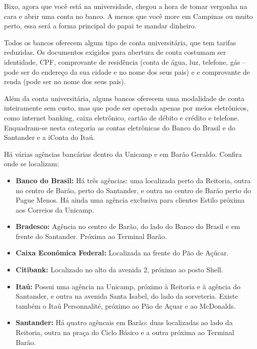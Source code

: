 Bixo, agora que você está na universidade, chegou a hora de tomar vergonha na
cara e abrir uma conta no banco. A menos que você more em Campinas ou muito perto,
essa será a forma principal do papai te mandar dinheiro.

Todos os bancos oferecem algum tipo de conta universitária, que tem tarifas
reduzidas. Os documentos exigidos para abertura de conta costumam ser identidade,
CPF, comprovante de residência (conta de água, luz, telefone, gás -- pode ser do
endereço da sua cidade e no nome dos seus pais) e e comprovante de renda (pode
ser no nome dos seus pais).

Além da conta universitária, alguns bancos oferecem uma modalidade de conta
inteiramente sem custo, mas que pode ser operada apenas por meios eletrônicos,
como internet banking, caixa eletrônico, cartão de débito e crédito e telefone.
Enquadram-se nesta categoria as contas eletrônicas do Banco do Brasil e do Santander
e a iConta do Itaú.

Há várias agências bancárias dentro da Unicamp e em Barão Geraldo. Confira onde
se localizam:

\begin{itemize}
    \item  \textbf{Banco do Brasil:} Há
    três agências: uma localizada perto da Reitoria, outra no centro de Barão,
    perto do Santander, e outra no centro de Barão perto do Pague Menos. Há ainda uma
	agência exclusiva para clientes Estilo próxima aos Correios da Unicamp.

    \item  \textbf{Bradesco:} Agência no centro de Barão, do lado do Banco do
    Brasil e em frente do Santander. Próxima ao Terminal Barão.

    \item  \textbf{Caixa Econômica Federal:} Localizada na frente do Pão de
    Açúcar.
    
    \item  \textbf{Citibank:} Localizado no alto da avenida 2, próximo ao posto
    Shell.

    \item  \textbf{Itaú:} Possui uma agência na Unicamp, próximo à Reitoria
    e à agência do Santander, e outra na avenida Santa Isabel, do lado da
    sorveteria. Existe também o Itaú Personnalité, próximo ao Pão de Açuar e ao
    McDonalds.

    \item  \textbf{Santander:} Há quatro agêncais em Barão: duas localizadas ao
    lado da Reitoria, outra na praça do Ciclo Básico e a outra próxima ao
    Terminal Barão.
\end{itemize}

